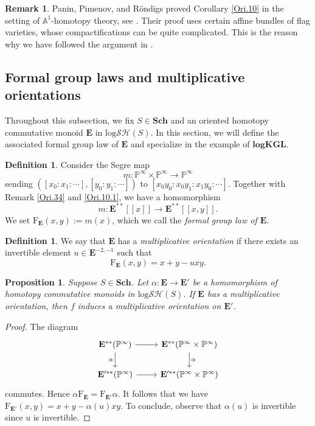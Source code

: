 \documentclass[11pt, a4paper]{amsart}
\newtheorem{prop}[thm]{Proposition}
\theoremstyle{definition}
\newtheorem{df}[thm]{Definition}
\newtheorem{rmk}[thm]{Remark}
\numberwithin{equation}{subsection}
\renewcommand{\P}{\mathbb{P}}
\newcommand{\A}{\mathbb{A}}
\newcommand{\Sch}{\mathbf{Sch}}
\newcommand{\Formal}{\mathrm{F}}
\newcommand{\logKGL}{\mathbf{logKGL}}
\newcommand{\ringE}{\mathbf{E}}
\newcommand{\inflogSH}{\mathrm{log}\mathcal{SH}}
\begin{document}
\begin{rmk}
Panin, Pimenov, and R\"ondigs proved Corollary \ref{Ori.10} in the setting of 
$\A^1$-homotopy theory, 
see \cite[Theorem 2.2]{zbMATH05367298}.
Their proof uses certain affine bundles of flag varieties, 
whose compactifications can be quite complicated.
This is the reason why we have followed the argument in \cite{zbMATH05663788}.
\end{rmk}





\subsection{Formal group laws and multiplicative orientations}
\label{formal}
Throughout this subsection, we fix $S\in \Sch$ and an oriented homotopy commutative monoid $\ringE$ in $\inflogSH(S)$.
In this section, 
we will define the associated formal group law of $\ringE$ and specialize in the example of $\logKGL$.

\begin{df}
\label{Ori.61}
Consider the Segre map
\begin{equation}
\label{Ori.61.1}
m\colon \P^\infty \times \P^\infty
\to
\P^\infty
\end{equation}
sending $([x_0:x_1:\cdots],[y_0:y_1:\cdots])$ to $[x_0y_0:x_0y_1:x_1y_0:\cdots]$.
Together with Remark \ref{Ori.34} and \eqref{Ori.10.1}, we have a homomorphism
\[
m
\colon
\ringE^{**}[[x]]
\to
\ringE^{**}[[x,y]].
\]
We set $\Formal_{\ringE}(x,y):=m(x)$,\index[notation]{FormalE @ $\Formal_{\ringE}(x,y)$} which we call the \emph{formal group law of $\ringE$}.
\end{df}


\begin{df}
\label{trace.5}
We say that $\ringE$ has a \emph{multiplicative orientation}  if there exists 
an invertible element $u\in \ringE^{-2,-1}$ such that 
\[
\Formal_{\ringE}(x,y)=x+y-uxy.
\]
\end{df}

\begin{prop}
\label{trace.6}
Suppose $S\in \Sch$.
Let $\alpha\colon \ringE\to \ringE'$ be a homomorphism of homotopy commutative monoids in $\inflogSH(S)$.
If $\ringE$ has a multiplicative orientation, 
then $f$ induces a multiplicative orientation on $\ringE'$.
\end{prop}
\begin{proof}
The diagram
\[
\begin{tikzcd}
\ringE^{**}(\P^\infty)\ar[d,"\alpha"']\ar[r]&
\ringE^{**}(\P^\infty\times \P^\infty)\ar[d,"\alpha"]
\\
\ringE'^{**}(\P^\infty)\ar[r]&
\ringE'^{**}(\P^\infty \times \P^\infty)
\end{tikzcd}
\]
commutes.
Hence $\alpha \Formal_{\ringE} = \Formal_{\ringE'}\alpha$.
It follows that we have $\Formal_{\ringE'}(x,y)=x+y-\alpha(u)xy$.
To conclude, observe that $\alpha(u)$ is invertible since $u$ is invertible.
\end{proof}
\end{document}
